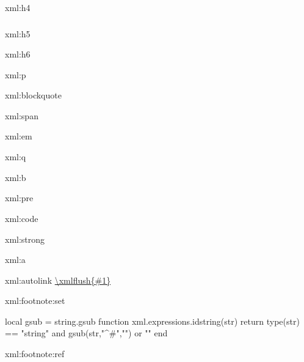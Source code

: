 \startxmlsetups xml:h4
    \subsubsection{}
\stopxmlsetups

\startxmlsetups xml:h5
\stopxmlsetups

\startxmlsetups xml:h6
\stopxmlsetups

\startxmlsetups xml:p
     {
        \dontleavehmode
        \ignorespaces
        \removeunwantedspaces
    }
    \par
\stopxmlsetups

\startxmlsetups xml:blockquote
    \startnarrow{}\stopnarrow
\stopxmlsetups

\startxmlsetups xml:span
   \begingroup{}\endgroup
\stopxmlsetups

\startxmlsetups xml:em
    \begingroup\em {}\endgroup
\stopxmlsetups

\startxmlsetups xml:q
\stopxmlsetups

\startxmlsetups xml:b
    \begingroup\bf{}\endgroup
\stopxmlsetups

\startxmlsetups xml:pre
    \par
\stopxmlsetups

\startxmlsetups xml:code
    \begingroup\tt{}\endgroup
\stopxmlsetups

\startxmlsetups xml:strong
    \begingroup\bf{}\endgroup
\stopxmlsetups

\startxmlsetups xml:a
    \href{\xmlatt{#1}{href}}{}
\stopxmlsetups

\startxmlsetups xml:autolink
    \url{\xmlflush{#1}}
\stopxmlsetups

\startxmlsetups xml:footnote:set
     \startfootnote
     \stopfootnote
\stopxmlsetups

\startluacode
     local gsub = string.gsub
     function xml.expressions.idstring(str)
         return type(str) == "string" and gsub(str,"^#","") or ""
     end
\stopluacode

\startxmlsetups xml:footnote:ref
\stopxmlsetups



